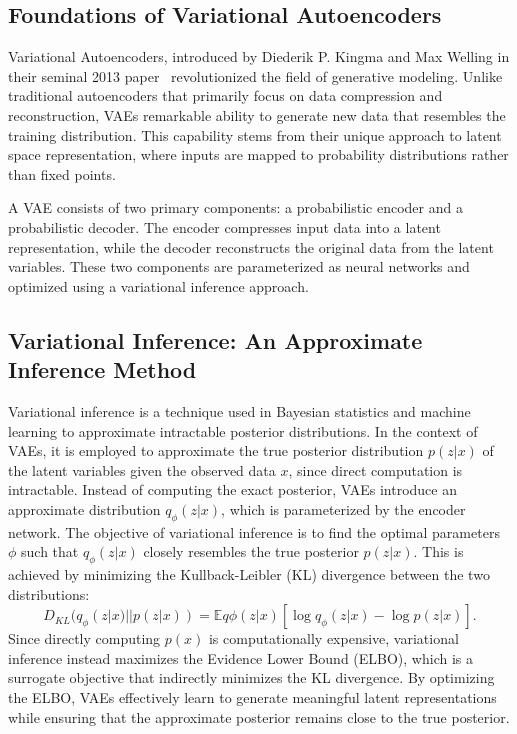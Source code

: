 \subsection{Foundations of Variational Autoencoders}
Variational Autoencoders, introduced by Diederik P. Kingma and Max Welling in their seminal 2013 paper~\cite{kingma2022autoencodingvariationalbayes} revolutionized the field of generative modeling. Unlike traditional autoencoders that primarily focus on data compression and reconstruction, VAEs remarkable ability to generate new data that resembles the training distribution. This capability stems from their unique approach to latent space representation, where inputs are mapped to probability distributions rather than fixed points. 

A VAE consists of two primary components: a probabilistic encoder and a probabilistic decoder. The encoder compresses input data into a latent representation, while the decoder reconstructs the original data from the latent variables. These two components are parameterized as neural networks and optimized using a variational inference approach.

\subsection{Variational Inference: An Approximate Inference Method}
Variational inference is a technique used in Bayesian statistics and machine learning to approximate intractable posterior distributions. In the context of VAEs, it is employed to approximate the true posterior distribution $p(z|x)$ of the latent variables given the observed data $x$, since direct computation is intractable. Instead of computing the exact posterior, VAEs introduce an approximate distribution $q_\phi(z|x)$, which is parameterized by the encoder network. The objective of variational inference is to find the optimal parameters $\phi$ such that $q_\phi(z|x)$ closely resembles the true posterior $p(z|x)$. This is achieved by minimizing the Kullback-Leibler (KL) divergence between the two distributions:
\begin{equation}
D_{KL}(q_\phi(z|x) || p(z|x)) = \mathbb{E}{q\phi(z|x)}[\log q_\phi(z|x) - \log p(z|x)].
\end{equation}
Since directly computing $p(x)$ is computationally expensive, variational inference instead maximizes the Evidence Lower Bound (ELBO), which is a surrogate objective that indirectly minimizes the KL divergence. By optimizing the ELBO, VAEs effectively learn to generate meaningful latent representations while ensuring that the approximate posterior remains close to the true posterior.

